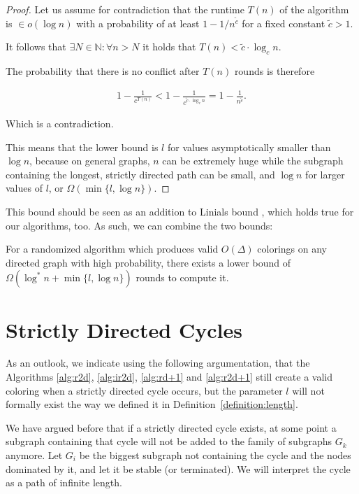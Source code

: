 \begin{proof}
Let us assume for contradiction that the runtime $T(n)$ of the algorithm is $\in o(\log n)$ with a probability of at least $1-1/n^{\tilde{c}}$ for a fixed constant $\tilde{c} > 1$.

It follows that $\exists N \in \mathbb{N} : \forall n > N$ it holds that $T(n) < \tilde{c} \cdot \log_c n$.

The probability that there is no conflict after $T(n)$ rounds is therefore 

\begin{align*}
1-\frac{1}{ c^{T(n)} } < 1- \frac{1}{c^{\tilde{c} \cdot \log_c n}} = 1- \frac{1}{n^{\tilde{c}}}.
\end{align*}

Which is a contradiction.

This means that the lower bound is $l$ for values asymptotically smaller than $\log n$, because on general graphs, $n$ can be extremely huge while the subgraph containing the longest, strictly directed path can be small, and $\log n$ for larger values of $l$, or $\Omega (\min\{l, \log n\})$.
\end{proof}


This bound should be seen as an addition to Linials bound \cite{linial1992locality}, which holds true for our algorithms, too. As such, we can combine the two bounds:

\begin{corollary}
	For a randomized algorithm which produces valid $O(\Delta)$ colorings on any directed graph with high probability, there exists a lower bound of $\Omega (\log^* n + \min\{l, \log n\})$ rounds to compute it.
\end{corollary}


\section{Strictly Directed Cycles}\label{lemma:cycles}

As an outlook, we indicate using the following argumentation, that the Algorithms \ref{alg:r2d}, \ref{alg:ir2d}, \ref{alg:rd+1} and \ref{alg:r2d+1} still create a valid coloring when a strictly directed cycle occurs, but the parameter $l$ will not formally exist the way we defined it in Definition~\ref{definition:length}.

We have argued before that if a strictly directed cycle exists, at some point a subgraph containing that cycle will not be added to the family of subgraphs $G_k$ anymore. Let $G_i$ be the biggest subgraph not containing the cycle and the nodes dominated by it, and let it be stable (or terminated). We will interpret the cycle as a path of infinite length.

